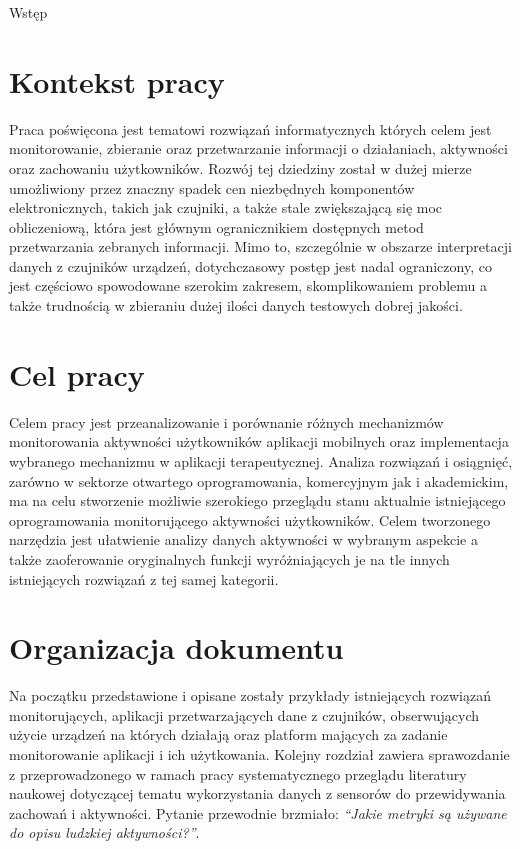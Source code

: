 \begin{chapter}{Wstęp}
	\newcommand{\chapterPath}{chapters/Introduction}

	\section{Kontekst pracy}
	Praca poświęcona jest tematowi rozwiązań informatycznych których celem jest monitorowanie, zbieranie oraz przetwarzanie informacji o działaniach, aktywności oraz zachowaniu użytkowników. Rozwój tej dziedziny został w dużej mierze umożliwiony przez znaczny spadek cen niezbędnych komponentów elektronicznych, takich jak czujniki, a także stale zwiększającą się moc obliczeniową, która jest głównym ogranicznikiem dostępnych metod przetwarzania zebranych informacji. Mimo to, szczególnie w obszarze interpretacji danych z czujników urządzeń, dotychczasowy postęp jest nadal ograniczony, co jest częściowo spowodowane szerokim zakresem, skomplikowaniem problemu a także trudnością w zbieraniu dużej ilości danych testowych dobrej jakości. 
	
	\section{Cel pracy}
	Celem pracy jest przeanalizowanie i porównanie różnych mechanizmów monitorowania aktywności użytkowników aplikacji mobilnych oraz implementacja wybranego mechanizmu w aplikacji terapeutycznej. Analiza rozwiązań i osiągnięć, zarówno w sektorze otwartego oprogramowania, komercyjnym jak i akademickim, ma na celu stworzenie możliwie szerokiego przeglądu stanu aktualnie istniejącego oprogramowania monitorującego aktywności użytkowników. Celem tworzonego narzędzia jest ułatwienie analizy danych aktywności w wybranym aspekcie a także zaoferowanie oryginalnych funkcji wyróżniających je na tle innych istniejących rozwiązań z tej samej kategorii.
	
	\section{Organizacja dokumentu}
	Na początku przedstawione i opisane zostały przykłady istniejących rozwiązań monitorujących, aplikacji przetwarzających dane z czujników, obserwujących użycie urządzeń na których działają oraz platform mających za zadanie monitorowanie aplikacji i ich użytkowania. Kolejny rozdział zawiera sprawozdanie z przeprowadzonego w ramach pracy systematycznego przeglądu literatury naukowej dotyczącej tematu wykorzystania danych z sensorów do przewidywania zachowań i aktywności. Pytanie przewodnie brzmiało: {\it ``Jakie metryki są używane do opisu ludzkiej aktywności?''}. 
	

\end{chapter}
